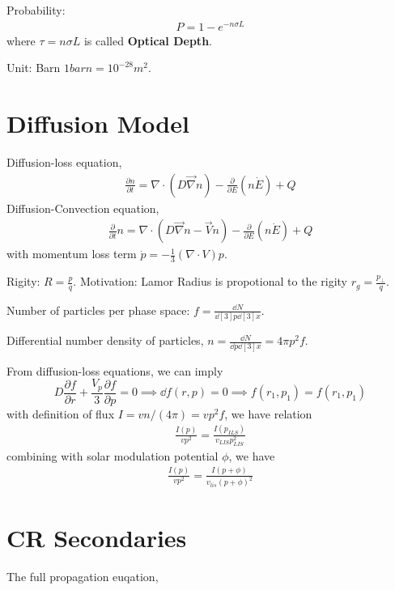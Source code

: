 \documentclass{sciposter}
\begin{document}
\begin{multicols}{3}
Probability:
\begin{align}
    P=1-e^{-n\sigma L} 
\end{align}
where $\tau=n\sigma L$ is called \textbf{Optical Depth}.

Unit: Barn $1 barn = 10^{-28}m^{2}  $.




\section{Diffusion Model}

Diffusion-loss equation,
\begin{align}
    \frac{\partial n}{\partial t}=\nabla \cdot \left(D \vec{\nabla}n\right)-\frac{\partial}{\partial E}(n\dot{E})+Q
\end{align}
Diffusion-Convection equation,
\begin{align}
    \frac{\partial}{\partial t}n=\nabla \cdot \left(D\vec{\nabla}n-\vec{V}n\right)-\frac{\partial }{\partial E}(n\dot{E})+Q
\end{align}
with momentum loss term $\dot{p}=-\frac{1}{3}(\nabla \cdot V)p$.

Rigity: $R=\frac{p}{q}$. Motivation: Lamor Radius is propotional to the rigity $r_{g}=\frac{p_{\bot } }{q} $.

Number of particles per phase space: $f=\frac{\dd{N}}{\dd[3]{p}\dd[3]{x}}$.

Differential number density of particles, $n=\frac{\dd{N}}{\dd{p}\dd[3]{x}}=4\pi p^{2}f $.

From diffusion-loss equations, we can imply $$D\frac{\partial f}{\partial r}+\frac{V_{p} }{3}\frac{\partial f}{\partial p}=0 \implies \dd{f}(r,p)=0 \implies f(r_{1},p_{1}  )=f(r_{1},p_{1}  )  $$ 
with definition of flux $I=v n/(4 \pi)=vp^{2}f  $, we have relation
\begin{align}
    \frac{I(p)}{v p^{2} }=\frac{I(p_{ILS} ) }{v_{LIS}p_{LIS}^{2}   }
\end{align}
combining with solar modulation potential $\phi$, we have 
\begin{align}
    \frac{I(p)}{v p^{2} }=\frac{I(p+\phi ) }{v_{lis}(p+\phi)^{2}    }
\end{align}

\section{CR Secondaries}
The full propagation euqation,


\end{multicols}
\end{document}
